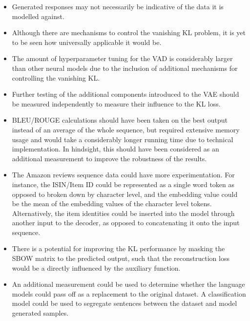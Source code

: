\documentclass[12pt,twoside]{report}
\begin{document}

\begin{itemize}  
\item Generated responses may not necessarily be indicative of the data it is modelled against.
\item Although there are mechanisms to control the vanishing KL problem, it is yet to be seen how universally applicable it would be.
\item The amount of hyperparameter tuning for the VAD is considerably larger than other neural models due to the inclusion of additional mechanisms for controlling the vanishing KL.
\item Further testing of the additional components introduced to the VAE should be measured independently to measure their influence to the KL loss. 
\item BLEU/ROUGE calculations should have been taken on the best output instead of an average of the whole sequence, but required extensive memory usage and would take a considerably longer running time due to technical implementation. In hindsight, this should have been considered as an additional measurement to improve the robustness of the results.
\item The Amazon reviews sequence data could have more experimentation. For instance, the ISIN/Item ID could be represented as a single word token as opposed to broken down by character level, and the  embedding value could be the mean of the embedding values of the character level tokens. Alternatively, the item identities could be inserted into the model through another input to the decoder, as opposed to concatenating it onto the input sequence. 
\item There is a potential for improving the KL performance by masking the SBOW matrix to the predicted output, such that the reconstruction loss would be a directly influenced by the auxiliary function.
\item An additional measurement could be used to determine whether the language models could pass off as a replacement to the original dataset. A classification model could be used to segregate sentences between the dataset and model generated samples. 
\end{itemize}


\end{document}
